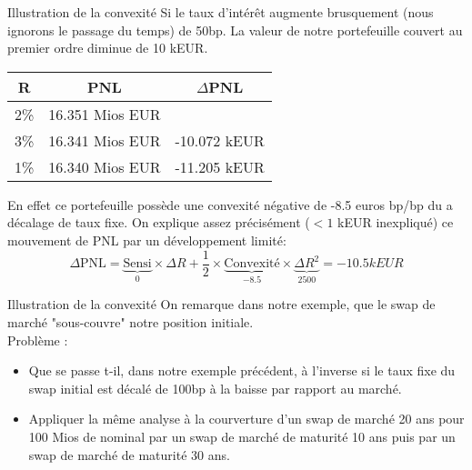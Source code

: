\documentclass{beamer}
\begin{document}
\begin{frame}{Illustration de la convexité}
Si le taux d'intérêt augmente brusquement (nous ignorons le passage du temps)  de 50bp.
La valeur de notre portefeuille couvert au premier ordre diminue de 10 kEUR.\\
\begin{center}
\begin{tabular}{|c|c|c|}
\hline
R&PNL&$\Delta$PNL \\
\hline
2\% &16.351 Mios EUR& \\ 
3\% &16.341 Mios EUR&-10.072 kEUR\\
1\% &16.340 Mios EUR&-11.205 kEUR\\
\hline
\hline
\end{tabular}
\end{center}
En effet ce portefeuille possède une convexité négative de -8.5 euros bp/bp du a décalage de taux fixe.
On explique assez précisément ($<1$ kEUR inexpliqué) ce mouvement de PNL par un développement limité:
\[
\Delta \text{PNL}=\underbrace{\text{Sensi}}_{0} \times \Delta R + \frac{1}{2} \times \underbrace{\text{Convexité}}_{-8.5} \times \underbrace{\Delta R^2}_{2500}=-10.5 kEUR
\]
\end{frame}

\begin{frame}{Illustration de la convexité}
On remarque dans notre exemple, que le swap de marché "sous-couvre" notre position initiale.\\
\vspace{0.5 cm}
Problème :
\begin{itemize}
\item Que se passe t-il, dans notre exemple précédent, à l'inverse si le taux fixe du swap initial est décalé de 100bp à la baisse par rapport au marché.
\item Appliquer la même analyse à la courverture d'un swap de marché 20 ans pour 100 Mios de nominal par un swap de marché de maturité 10 ans puis par un swap de marché de maturité 30 ans.
\end{itemize}
\end{frame}
\end{document}
